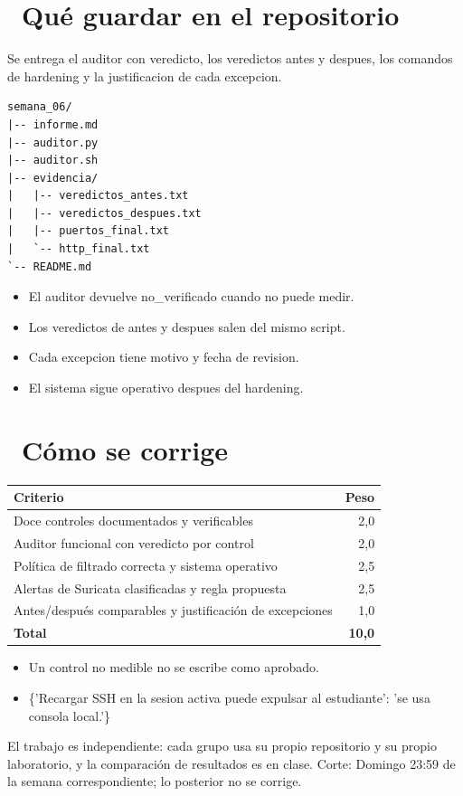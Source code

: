 \documentclass[11pt,a4paper]{article}
\newcommand{\iconotexto}[2]{\textcolor{cyanNeon}{\faIcon{#1}}~#2}
\begin{document}
\section{\iconotexto{box-open}{Qué guardar en el repositorio}}

Se entrega el auditor con veredicto, los veredictos antes y despues, los comandos de hardening y la justificacion de cada excepcion.

\begin{lstlisting}[style=estiloCodigo]
semana_06/
|-- informe.md
|-- auditor.py
|-- auditor.sh
|-- evidencia/
|   |-- veredictos_antes.txt
|   |-- veredictos_despues.txt
|   |-- puertos_final.txt
|   `-- http_final.txt
`-- README.md
\end{lstlisting}

\begin{itemize}[leftmargin=1.4em,itemsep=2pt,topsep=3pt]
  \item El auditor devuelve no\_verificado cuando no puede medir.
  \item Los veredictos de antes y despues salen del mismo script.
  \item Cada excepcion tiene motivo y fecha de revision.
  \item El sistema sigue operativo despues del hardening.
\end{itemize}

\section{\iconotexto{ruler-combined}{Cómo se corrige}}

\begin{tabularx}{\linewidth}{@{}X r@{}}
\toprule
Criterio & Peso\\
\midrule
Doce controles documentados y verificables & 2,0 \\
Auditor funcional con veredicto por control & 2,0 \\
Política de filtrado correcta y sistema operativo & 2,5 \\
Alertas de Suricata clasificadas y regla propuesta & 2,5 \\
Antes/después comparables y justificación de excepciones & 1,0 \\
\midrule
\textbf{Total} & \textbf{10,0}\\
\bottomrule
\end{tabularx}

\begin{itemize}[leftmargin=1.4em,itemsep=2pt,topsep=3pt]
  \item Un control no medible no se escribe como aprobado.
  \item \{'Recargar SSH en la sesion activa puede expulsar al estudiante': 'se usa consola local.'\}
\end{itemize}

\begin{cajaRecuerda}El trabajo es independiente: cada grupo usa su propio repositorio y su propio laboratorio, y la comparación de resultados es en clase. Corte: Domingo 23:59 de la semana correspondiente; lo posterior no se corrige.
\end{cajaRecuerda}
\end{document}
